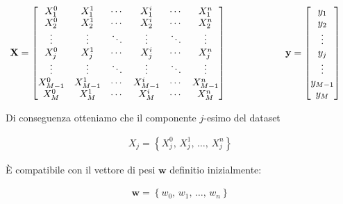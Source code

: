 \begin{gather*}
    \begin{aligned}
        \mathbf{X} &= 
            \begin{bmatrix}
            X_1^0       & X_1^1         & \cdots     & X_1^i         & \cdots     & X_1^n     \\
            X_2^0       & X_2^1         & \cdots     & X_2^i         & \cdots     & X_2^n     \\
            \vdots      & \vdots        & \ddots     & \vdots        & \ddots     & \vdots    \\
            X_j^0       & X_j^1         & \cdots     & X_j^i         & \cdots     & X_j^n     \\
            \vdots      & \vdots        & \ddots     & \vdots        & \ddots     & \vdots    \\
            X_{M-1}^0   & X_{M-1}^1     & \cdots     & X_{M-1}^i     & \cdots     & X_{M-1}^n \\
            X_M^0       & X_M^1         & \cdots     & X_M^i         & \cdots     & X_M^n     \\
            \end{bmatrix}
        \hspace{60px}
        \mathbf{y} = 
            \begin{bmatrix}
            y_1 \\ y_2 \\ \vdots \\ y_j \\ \vdots \\ y_{M-1} \\ y_M
            \end{bmatrix}
    \end{aligned}
\end{gather*}

\noindent Di conseguenza otteniamo che il componente $j$-esimo del dataset

\begin{gather*}
    X_j = \left\{ X_j^0,\, X_j^1,\,\dots,\, X_j^n \right\}
\end{gather*}

\noindent È compatibile con il vettore di pesi $\mathbf{w}$ definitio inizialmente:

\begin{gather*}
    \mathbf{w} = \left\{w_0,\, w_1,\, \dots,\, w_n \right\}
\end{gather*}



